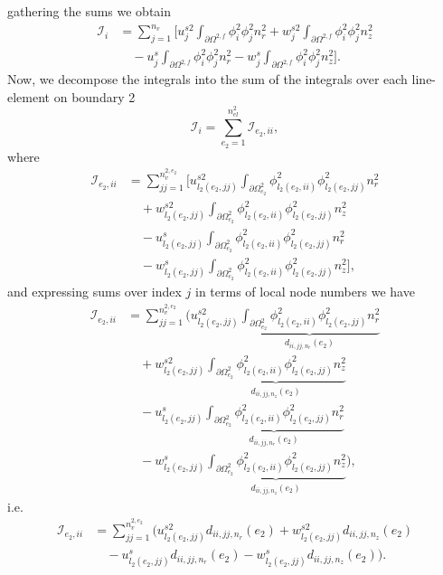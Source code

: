 \documentclass{article}
\begin{document}
gathering the sums we obtain
\begin{align}
\mathcal{I}_i &= \sum_{j=1}^{n_v} \Bigg[ u_j^{s2} \int_{\partial \Omega^{2,f}} \phi_i^2 \phi_j^2 n_r^2 + w_j^{s2} \int_{\partial \Omega^{2,f}} \phi_i^2 \phi_j^2 n_z^2 \nonumber\\
&\quad - u_j^s \int_{\partial \Omega^{2,f}} \phi_i^2 \phi_j^2 n_r^2 - w_j^s \int_{\partial \Omega^{2,f}} \phi_i^2 \phi_j^2 n_z^2 \Bigg]. \tag{8.10}
\end{align}
Now, we decompose the integrals into the sum of the integrals over each line-element on boundary 2
\begin{equation}
\mathcal{I}_i = \sum_{e_2=1}^{n_{el}^2} \mathcal{I}_{e_2,ii}, \tag{8.11}
\end{equation}
where
\begin{align}
\mathcal{I}_{e_2,ii} &= \sum_{jj=1}^{n_v^{2,e_2}} \Bigg[ u_{l_2(e_2,jj)}^{s2} \int_{\partial \Omega_{e_2}^2} \phi_{l_2(e_2,ii)}^2 \phi_{l_2(e_2,jj)}^2 n_r^2 \nonumber\\
&\quad + w_{l_2(e_2,jj)}^{s2} \int_{\partial \Omega_{e_2}^2} \phi_{l_2(e_2,ii)}^2 \phi_{l_2(e_2,jj)}^2 n_z^2 \nonumber\\
&\quad - u_{l_2(e_2,jj)}^s \int_{\partial \Omega_{e_2}^2} \phi_{l_2(e_2,ii)}^2 \phi_{l_2(e_2,jj)}^2 n_r^2 \nonumber\\
&\quad - w_{l_2(e_2,jj)}^s \int_{\partial \Omega_{e_2}^2} \phi_{l_2(e_2,ii)}^2 \phi_{l_2(e_2,jj)}^2 n_z^2 \Bigg], \tag{8.12}
\end{align}
and expressing sums over index $j$ in terms of local node numbers we have
\begin{align}
\mathcal{I}_{e_2,ii} &= \sum_{jj=1}^{n_v^{2,e_2}} \Bigg( u_{l_2(e_2,jj)}^{s2} \underbrace{\int_{\partial \Omega_{e_2}^2} \phi_{l_2(e_2,ii)}^2 \phi_{l_2(e_2,jj)}^2 n_r^2}_{d_{ii,jj,n_r}(e_2)} \nonumber\\
&\quad + w_{l_2(e_2,jj)}^{s2} \underbrace{\int_{\partial \Omega_{e_2}^2} \phi_{l_2(e_2,ii)}^2 \phi_{l_2(e_2,jj)}^2 n_z^2}_{d_{ii,jj,n_z}(e_2)} \nonumber\\
&\quad - u_{l_2(e_2,jj)}^s \underbrace{\int_{\partial \Omega_{e_2}^2} \phi_{l_2(e_2,ii)}^2 \phi_{l_2(e_2,jj)}^2 n_r^2}_{d_{ii,jj,n_r}(e_2)} \nonumber\\
&\quad - w_{l_2(e_2,jj)}^s \underbrace{\int_{\partial \Omega_{e_2}^2} \phi_{l_2(e_2,ii)}^2 \phi_{l_2(e_2,jj)}^2 n_z^2}_{d_{ii,jj,n_z}(e_2)} \Bigg), \tag{8.13}
\end{align}
i.e.
\begin{align}
\mathcal{I}_{e_2,ii} &= \sum_{jj=1}^{n_v^{2,e_2}} \Bigg( u_{l_2(e_2,jj)}^{s2} d_{ii,jj,n_r}(e_2) + w_{l_2(e_2,jj)}^{s2} d_{ii,jj,n_z}(e_2) \nonumber\\
&\quad - u_{l_2(e_2,jj)}^s d_{ii,jj,n_r}(e_2) - w_{l_2(e_2,jj)}^s d_{ii,jj,n_z}(e_2) \Bigg). \tag{8.14}
\end{align}
\end{document}
